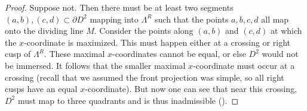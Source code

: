 \documentclass[a4paper,final, reqno]{amsart}
\theoremstyle{plain}
\theoremstyle{definition}
\begin{document}
	\begin{proof}
				
		Suppose not. Then there must be at least two segments $(a,b), (c,d) \subset \partial D^2$ mapping into $\Lambda^R$ such that the points $a,b,c,d$ all map onto the dividing line $M$. Consider the points along $(a,b)$ and $(c,d)$ at which the $x$-coordinate is maximized. This must happen either at a crossing or right cusp of $\Lambda^R$. These maximal $x$-coordinates cannot be equal, or else $D^2$ would not be immersed. It follows that the smaller maximal $x$-coordinate must occur at a crossing (recall that we assumed the front projection was simple, so all right cusps have an equal $x$-coordinate). But now one can see that near this crossing, $D^2$ must map to three quadrants and is thus inadmissible ().
	\end{proof}
	
\end{document}
